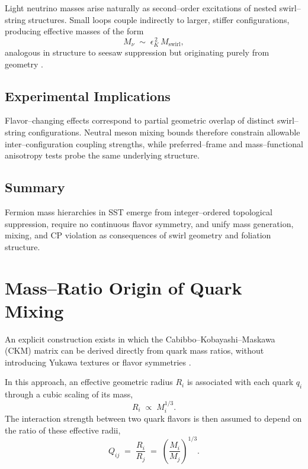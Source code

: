 \documentclass[11pt]{article}
\begin{document}
            Light neutrino masses arise naturally as second--order excitations of nested swirl--string
            structures. Small loops couple indirectly to larger, stiffer configurations, producing
            effective masses of the form
            \begin{equation}
                M_\nu \;\sim\; \epsilon_K^{\,2}\, M_{\mathrm{swirl}},
            \end{equation}
            analogous in structure to seesaw suppression but originating purely from geometry
            \cite{Minkowski1977,GellMann1979}.

        \subsection{Experimental Implications}

            Flavor--changing effects correspond to partial geometric overlap of distinct
            swirl--string configurations. Neutral meson mixing bounds therefore constrain allowable
            inter--configuration coupling strengths, while preferred--frame and mass--functional
            anisotropy tests probe the same underlying structure.

        \subsection{Summary}

            Fermion mass hierarchies in SST emerge from integer--ordered topological suppression,
            require no continuous flavor symmetry, and unify mass generation, mixing, and CP violation
            as consequences of swirl geometry and foliation structure.



    \section{Mass--Ratio Origin of Quark Mixing}
        \label{app:mass_ratio_ckm}

        An explicit construction exists in which the Cabibbo--Kobayashi--Maskawa (CKM)
        matrix can be derived directly from quark mass ratios, without introducing
        Yukawa textures or flavor symmetries \cite{NovelloAntunes2018CKM}.

        In this approach, an effective geometric radius $R_i$ is associated with each
        quark $q_i$ through a cubic scaling of its mass,
        \begin{equation}
            R_i \;\propto\; M_i^{1/3}.
        \end{equation}
        The interaction strength between two quark flavors is then assumed to depend
        on the ratio of these effective radii,
        \begin{equation}
            Q_{ij} \;=\; \frac{R_i}{R_j}
            \;=\;
            \left(\frac{M_i}{M_j}\right)^{1/3}.
            \label{eq:mass_ratio_Qij}
        \end{equation}
\end{document}
